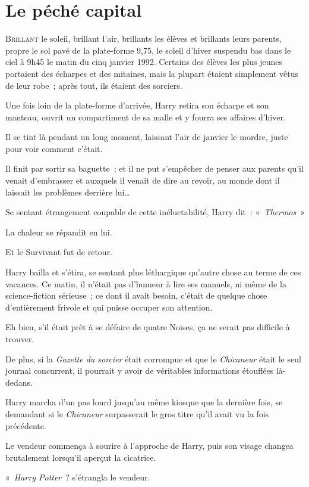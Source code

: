 \chapter{Le péché capital}

\lettrine{B}{rillant} le soleil, brillant l'air, brillants les élèves et brillants leurs parents, propre le sol pavé de la plate-forme 9,75, le soleil d'hiver suspendu bas dans le ciel à 9h45 le matin du cinq janvier 1992.
Certains des élèves les plus jeunes portaient des écharpes et des mitaines, mais la plupart étaient simplement vêtus de leur robe~; après tout, ils étaient des sorciers.

Une fois loin de la plate-forme d'arrivée, Harry retira son écharpe et son manteau, ouvrit un compartiment de sa malle et y fourra ses affaires d'hiver.

Il se tint là pendant un long moment, laissant l'air de janvier le mordre, juste pour voir comment c'était.

Il finit par sortir sa baguette~; et il ne put s'empêcher de penser aux parents qu'il venait d'embrasser et auxquels il venait de dire au revoir, au monde dont il laissait les problèmes derrière lui…

Se sentant étrangement coupable de cette inéluctabilité, Harry dit~: «~\emph{Thermos}~»

La chaleur se répandit en lui.

Et le Survivant fut de retour.

Harry bailla et s'étira, se sentant plus léthargique qu'autre chose au terme de ces vacances.
Ce matin, il n'était pas d'humeur à lire ses manuels, ni même de la science-fiction sérieuse~; ce dont il avait besoin, c'était de quelque chose d'entièrement frivole et qui puisse occuper son attention.

Eh bien, s'il était prêt à se défaire de quatre Noises, ça ne serait pas difficile à trouver.

De plus, si la \emph{Gazette du sorcier} était corrompue et que le \emph{Chicaneur} était le seul journal concurrent, il pourrait y avoir de véritables informations étouffées là-dedans.

Harry marcha d'un pas lourd jusqu'au même kiosque que la dernière fois, se demandant si le \emph{Chicaneur} surpasserait le gros titre qu'il avait vu la fois précédente.

Le vendeur commença à sourire à l'approche de Harry, puis son visage changea brutalement lorsqu'il aperçut la cicatrice.

«~\emph{Harry Potter}~? s'étrangla le vendeur.

